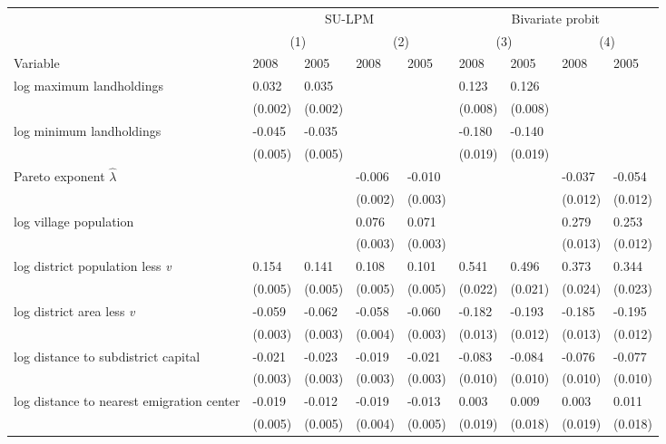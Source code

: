 \begin{table}[!h]
\centering
\begin{tabular}{>{\raggedright\arraybackslash}p{2.8cm}llllllll}
\toprule
\multicolumn{1}{c}{ } & \multicolumn{4}{c}{SU-LPM} & \multicolumn{4}{c}{Bivariate probit} \\
\cmidrule(l{3pt}r{3pt}){2-5} \cmidrule(l{3pt}r{3pt}){6-9}
\multicolumn{1}{c}{ } & \multicolumn{2}{c}{(1)} & \multicolumn{2}{c}{(2)} & \multicolumn{2}{c}{(3)} & \multicolumn{2}{c}{(4)} \\
\cmidrule(l{3pt}r{3pt}){2-3} \cmidrule(l{3pt}r{3pt}){4-5} \cmidrule(l{3pt}r{3pt}){6-7} \cmidrule(l{3pt}r{3pt}){8-9}
Variable & 2008 & 2005 & 2008 & 2005 & 2008 & 2005 & 2008 & 2005\\
\midrule
log maximum landholdings & 0.032 & 0.035 &  &  & 0.123 & 0.126 &  & \\
 & (0.002) & (0.002) &  &  & (0.008) & (0.008) &  & \\
log minimum landholdings & -0.045 & -0.035 &  &  & -0.180 & -0.140 &  & \\
 & (0.005) & (0.005) &  &  & (0.019) & (0.019) &  & \\
Pareto exponent $\widehat{\lambda}$ &  &  & -0.006 & -0.010 &  &  & -0.037 & -0.054\\
 &  &  & (0.002) & (0.003) &  &  & (0.012) & (0.012)\\
log village population &  &  & 0.076 & 0.071 &  &  & 0.279 & 0.253\\
 &  &  & (0.003) & (0.003) &  &  & (0.013) & (0.012)\\
log district population less \emph{v} & 0.154 & 0.141 & 0.108 & 0.101 & 0.541 & 0.496 & 0.373 & 0.344\\
 & (0.005) & (0.005) & (0.005) & (0.005) & (0.022) & (0.021) & (0.024) & (0.023)\\
log district area less \emph{v} & -0.059 & -0.062 & -0.058 & -0.060 & -0.182 & -0.193 & -0.185 & -0.195\\
 & (0.003) & (0.003) & (0.004) & (0.003) & (0.013) & (0.012) & (0.013) & (0.012)\\
log distance to subdistrict capital & -0.021 & -0.023 & -0.019 & -0.021 & -0.083 & -0.084 & -0.076 & -0.077\\
 & (0.003) & (0.003) & (0.003) & (0.003) & (0.010) & (0.010) & (0.010) & (0.010)\\
log distance to nearest emigration center & -0.019 & -0.012 & -0.019 & -0.013 & 0.003 & 0.009 & 0.003 & 0.011\\
 & (0.005) & (0.005) & (0.004) & (0.005) & (0.019) & (0.018) & (0.019) & (0.018)\\

\end{tabular}
\end{table}
